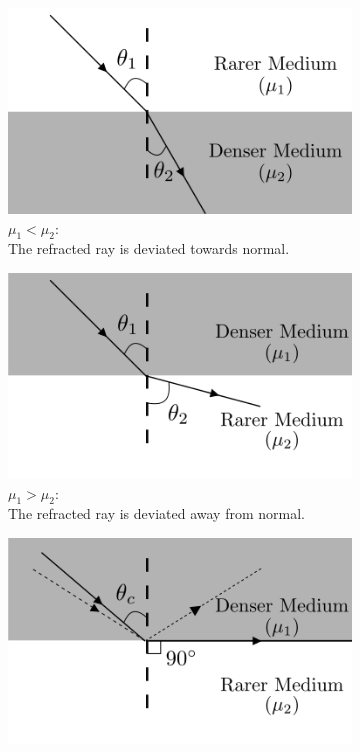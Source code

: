 \begin{figure}[!htb]
\captionsetup[subfigure]{justification=centering}
\centering
        \begin{subfigure}[b]{0.5\textwidth}
        \centering
                \includegraphics[scale=0.5]{figs/snell1.png}
                \caption{$\mu_1<\mu_2:$\\ The refracted ray is deviated towards normal.}
                \label{fig:rareToDense}
        \end{subfigure}\hfill
        \begin{subfigure}[b]{0.5\textwidth}
        \centering
                \includegraphics[scale=0.5]{figs/snell2.png}
                \caption{$\mu_1>\mu_2:$\\ The refracted ray is deviated away from normal.}
                \label{fig:denseToRare}
        \end{subfigure}
        \par\bigskip
        \begin{subfigure}[b]{\textwidth}
        \centering
                \includegraphics[scale=0.5]{figs/snell3.png}

\end{subfigure}
\end{figure}
